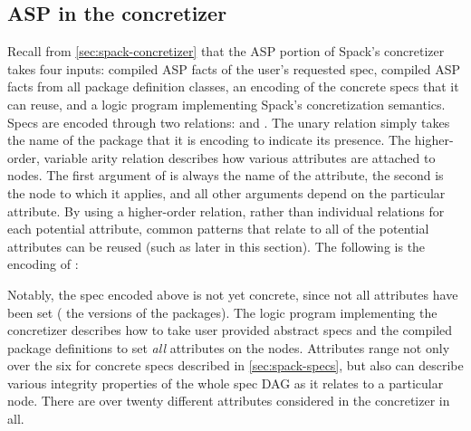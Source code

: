 \subsection{ASP in the concretizer}
\label{sec:impl-basic-asp}
Recall from \cref{sec:spack-concretizer} that the ASP portion of Spack's
concretizer takes four inputs: compiled ASP facts of the user's requested spec,
compiled ASP facts from all package definition classes, an encoding of the
concrete specs that it can reuse, and a logic program implementing
Spack's concretization semantics. Specs are encoded through two relations:
 and . The unary  relation simply takes the name
of the package that it is encoding to indicate its presence. The higher-order,
variable arity  relation describes how various attributes are
attached to nodes. The first argument of 
is always the name of the attribute, the second is the node to which it applies,
and all other arguments depend on the particular attribute. By using a
higher-order  relation, rather than individual relations for each
potential attribute, common patterns that relate to all of the potential
attributes can be reused (such as  later in this section). The
following is the encoding of :
\par\vspace{0.8em}\noindent\colorbox{whitesmoke}{\begin{minipage}{0.98\columnwidth}\end{minipage}}\vspace{0.8em}
Notably, the spec encoded above is not yet concrete, since not all attributes
have been set (\eg{} the versions of the packages). The logic program
implementing the concretizer describes how to take user provided abstract
specs and the compiled package definitions to set \emph{all} attributes on the
nodes. Attributes range not only over the six for concrete specs
described in \cref{sec:spack-specs}, but also can describe various integrity
properties of the whole spec DAG as it relates to a particular node.
There are over twenty different attributes considered in the concretizer in all.

